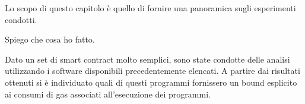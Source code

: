 
Lo scopo di questo capitolo è quello di fornire una panoramica sugli esperimenti condotti.\newline

Spiego che cosa ho fatto.

Dato un set di smart contract molto semplici, sono state condotte delle analisi utilizzando i software disponibili precedentemente elencati. A partire dai risultati ottenuti si è individuato quali di questi programmi fornissero un bound esplicito ai consumi di gas associati all'esecuzione dei programmi.\newline
